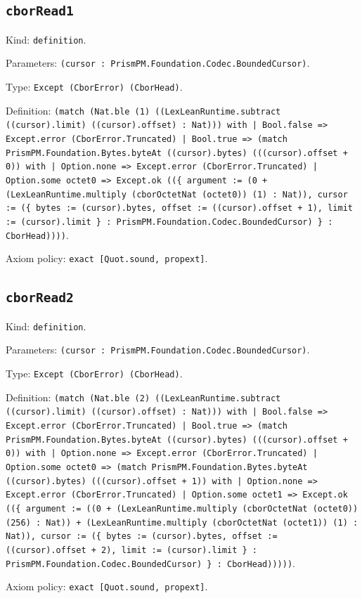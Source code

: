 \documentclass[11pt]{article}
\begin{document}
\subsection*{\texttt{cborRead1}}
\noindent Kind: \texttt{definition}.\par
\noindent Parameters: \texttt{(cursor : PrismPM.Foundation.Codec.BoundedCursor)}.\par
\noindent Type: \texttt{Except (CborError) (CborHead)}.\par
\noindent Definition: \texttt{(match (Nat.ble (1) ((LexLeanRuntime.subtract ((cursor).limit) ((cursor).offset) : Nat))) with | Bool.false => Except.error (CborError.Truncated) | Bool.true => (match PrismPM.Foundation.Bytes.byteAt ((cursor).bytes) (((cursor).offset + 0)) with | Option.none => Except.error (CborError.Truncated) | Option.some octet0 => Except.ok ((\{ argument := (0 + (LexLeanRuntime.multiply (cborOctetNat (octet0)) (1) : Nat)), cursor := (\{ bytes := (cursor).bytes, offset := ((cursor).offset + 1), limit := (cursor).limit \} : PrismPM.Foundation.Codec.BoundedCursor) \} : CborHead))))}.\par
\noindent Axiom policy: \texttt{exact [Quot.sound, propext]}.\par
\subsection*{\texttt{cborRead2}}
\noindent Kind: \texttt{definition}.\par
\noindent Parameters: \texttt{(cursor : PrismPM.Foundation.Codec.BoundedCursor)}.\par
\noindent Type: \texttt{Except (CborError) (CborHead)}.\par
\noindent Definition: \texttt{(match (Nat.ble (2) ((LexLeanRuntime.subtract ((cursor).limit) ((cursor).offset) : Nat))) with | Bool.false => Except.error (CborError.Truncated) | Bool.true => (match PrismPM.Foundation.Bytes.byteAt ((cursor).bytes) (((cursor).offset + 0)) with | Option.none => Except.error (CborError.Truncated) | Option.some octet0 => (match PrismPM.Foundation.Bytes.byteAt ((cursor).bytes) (((cursor).offset + 1)) with | Option.none => Except.error (CborError.Truncated) | Option.some octet1 => Except.ok ((\{ argument := ((0 + (LexLeanRuntime.multiply (cborOctetNat (octet0)) (256) : Nat)) + (LexLeanRuntime.multiply (cborOctetNat (octet1)) (1) : Nat)), cursor := (\{ bytes := (cursor).bytes, offset := ((cursor).offset + 2), limit := (cursor).limit \} : PrismPM.Foundation.Codec.BoundedCursor) \} : CborHead)))))}.\par
\noindent Axiom policy: \texttt{exact [Quot.sound, propext]}.\par
\end{document}
